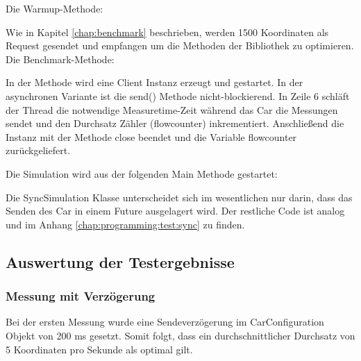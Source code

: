 

Die Warmup-Methode: 



Wie in Kapitel \ref{chap:benchmark} beschrieben, werden 1500 Koordinaten als Request gesendet und empfangen um die Methoden der Bibliothek zu optimieren.
\clearpage
Die Benchmark-Methode:



In der Methode wird eine Client Instanz erzeugt und gestartet. In der asynchronen Variante ist die send() Methode nicht-blockierend. In Zeile 6 schläft der Thread die notwendige Measuretime-Zeit während das Car die Messungen sendet und den Durchsatz Zähler (flowcounter) inkrementiert. Anschließend die Instanz mit der Methode close beendet und die Variable flowcounter zurückgeliefert.

Die Simulation wird aus der folgenden Main Methode gestartet:



Die SyncSimulation Klasse unterscheidet sich im wesentlichen nur darin, dass das Senden des Car in einem Future ausgelagert wird. Der restliche Code ist analog und im Anhang \ref{chap:programming:test:sync} zu finden.
\clearpage
\subsection{Auswertung der Testergebnisse}
\subsubsection{Messung mit Verzögerung}
Bei der ersten Messung wurde eine Sendeverzögerung im CarConfiguration Objekt von 200 ms gesetzt. Somit folgt, dass ein durchschnittlicher Durchsatz von 5 Koordinaten pro Sekunde als optimal gilt.

